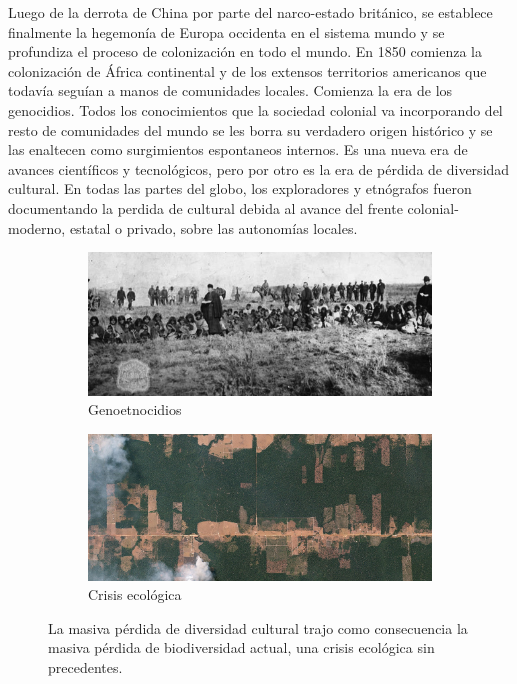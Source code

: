 \documentclass[a4paper,10pt]{book}
\theoremstyle{definition}
\begin{document}

Luego de la derrota de China por parte del narco-estado británico, se establece finalmente la hegemonía de Europa occidenta en el sistema mundo y se profundiza el proceso de colonización en todo el mundo. %
En 1850 comienza la colonización de África continental y de los extensos territorios americanos que todavía seguían a manos de comunidades locales.
Comienza la era de los genocidios.
Todos los conocimientos que la sociedad colonial va incorporando del resto de comunidades del mundo se les borra su verdadero origen histórico y se las enaltecen como surgimientos espontaneos internos.
Es una nueva era de avances científicos y tecnológicos, pero por otro es la era de pérdida de diversidad cultural.
En todas las partes del globo, los exploradores y etnógrafos fueron documentando la perdida de cultural debida al avance del frente colonial-moderno, estatal o privado, sobre las autonomías locales.

\begin{figure}[ht!]
    \centering
    \begin{subfigure}[b]{0.48\textwidth}
    \includegraphics[width=\linewidth]{static/genocidio_patagonia}
    \caption{Genoetnocidios}
    \label{fig:genocidio_patagonia}
    \end{subfigure}
    \begin{subfigure}[b]{0.47\textwidth}
    \includegraphics[width=\linewidth]{static/deforestation-brazil}
    \caption{Crisis ecológica}
    \label{fig:deforestation-brazil}
    \end{subfigure}
    \caption{
    La masiva pérdida de diversidad cultural trajo como consecuencia la masiva pérdida de biodiversidad actual, una crisis ecológica sin precedentes.
    }
    \label{fig:cultural-lose}
\end{figure}
\end{document}
